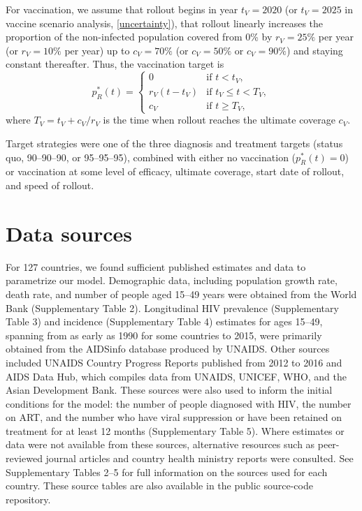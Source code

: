 \documentclass{article}
\begin{document}
For vaccination, we assume that rollout begins in year $t_V = 2020$
(or $t_V = 2025$ in vaccine scenario analysis, \autoref{uncertainty}),
that rollout linearly increases the proportion of the non-infected
population covered from 0\% by $r_V = 25\%$ per year (or $r_V = 10\%$
per year) up to $c_V = 70\%$ (or $c_V = 50\%$ or $c_V = 90\%$) and
staying constant thereafter.  Thus, the vaccination target is
\begin{equation}
  \label{vaccination_target}
  p_R^*(t) =
  \begin{cases}
    0 & \text{if $t < t_V$},
    \\
    r_V (t - t_V) & \text{if $t_V \leq t < T_V$},
    \\
    c_V & \text{if $t \geq T_V$},
  \end{cases}
\end{equation}
where $T_V = t_V + c_V / r_V$ is the time when rollout reaches
the ultimate coverage $c_V$.

Target strategies were one of the three diagnosis and treatment
targets (status quo, 90--90--90, or 95--95--95), combined with either
no vaccination ($p_R^*(t) = 0$) or vaccination at some level of
efficacy, ultimate coverage, start date of rollout, and speed of
rollout.


\section{Data sources}
\label{data_sources}

For 127 countries, we found sufficient published estimates and data to
parametrize our model.  Demographic data, including population growth
rate\cite{WorldBankpg}, death
rate\cite{World_Development_Indicators2013-ee}, and number of people
aged 15--49 years\cite{The_World_Bank2016-fd} were obtained from the
World Bank (Supplementary Table 2). Longitudinal HIV prevalence
(Supplementary Table 3) and incidence (Supplementary Table 4)
estimates for ages 15--49, spanning from as early as 1990 for some
countries to 2015, were primarily obtained from the AIDSinfo database
produced by UNAIDS\cite{Unaids2016-an}. Other sources included UNAIDS
Country Progress Reports\cite{Unaids2016-am} published from 2012 to
2016 and AIDS Data Hub\cite{AIDSdatahub-fg}, which compiles data from
UNAIDS, UNICEF, WHO, and the Asian Development Bank. These sources
were also used to inform the initial conditions for the model: the
number of people diagnosed with HIV, the number on ART, and the number
who have viral suppression or have been retained on treatment for at
least 12 months (Supplementary Table 5). Where estimates or data were
not available from these sources, alternative resources such as
peer-reviewed journal articles and country health ministry reports
were consulted.  See Supplementary Tables 2--5 for full information on
the sources used for each country.  These source tables are also
available in the public source-code repository\cite{medlock2016-git}.
\end{document}
